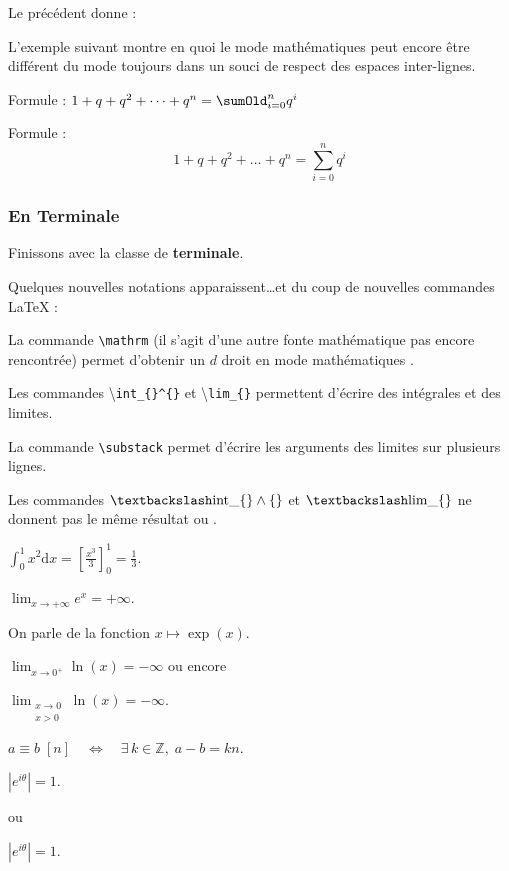 
Le  précédent donne :




L'exemple suivant montre en quoi le mode \og mathématiques\fg{}  peut encore être différent du mode  toujours dans un souci de respect des espaces inter-lignes.


Formule :
$1 + q + q^2 + \dots + q^n = \sumOld_{i = 0}^n q^i$

\medskip

Formule :
\[1 + q + q^2 + \dots + q^n=\sum_{i = 0}^n q^i\]

\subsubsection{En Terminale}

Finissons avec la classe de \textbf{terminale}.

Quelques nouvelles notations apparaissent\dots et du coup de nouvelles commandes \LaTeX{} :

La commande \texttt{\textbackslash mathrm} (il s'agit d'une autre fonte mathématique pas encore rencontrée) permet d'obtenir un $d$ droit en mode \og mathématiques \fg{}.

Les commandes \textbackslash\verb!int_{}^{}! et \textbackslash\verb!lim_{}! permettent d'écrire des intégrales et des limites.

La commande \verb!\substack! permet d'écrire les arguments des limites sur plusieurs lignes.

\begin{info}
Les commandes $\mathrm{\textbackslash int\_\{\}\wedge\{\}}$ et $\mathrm{\textbackslash lim\_\{\}}$ ne donnent pas le même résultat  ou .
\end{info}

{
\begin{SideBySideExample}
    $\int_0^1 x^2 \mathrm{d}x =
        \left[\frac{x^3}{3}\right]_0^1 =
        \frac 13$.\medskip

    $\lim_{x \to +\infty} e^x= +\infty$.\par
    On parle de la fonction $x \mapsto \exp(x)$.\medskip

    $\lim_{x \to 0^+}\ln(x) = -\infty$ ou encore\par
    $\lim_{\substack{x \to 0 \\ x > 0}}
            \ln(x) = -\infty$.\medskip

    $a \equiv b\; [n] \quad\Leftrightarrow\quad
        \exists\, k \in \mathds Z,\; a - b = kn$.\medskip
        
    $\left\lvert e^{i\theta}\right\rvert = 1$.
    
    ou
    
    $\left| e^{i\theta}\right| = 1$.
\end{SideBySideExample}
}\bigskip

